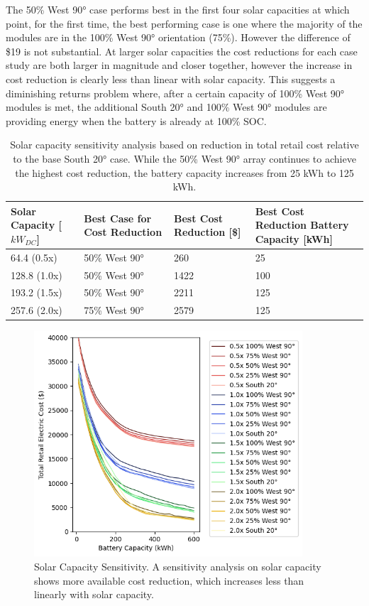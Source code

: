 \documentclass[journal,article,submit,pdftex,moreauthors]{Definitions/mdpi}
\begin{document}
The 50\% West 90° case performs best in the first four solar capacities
at which point, for the first time, the best performing case is one
where the majority of the modules are in the 100\% West 90° orientation
(75\%). However the difference of \$19 is not substantial. At larger
solar capacities the cost reductions for each case study are both larger
in magnitude and closer together, however the increase in cost reduction
is clearly less than linear with solar capacity. This suggests a
diminishing returns problem where, after a certain capacity of 100\%
West 90° modules is met, the additional South 20° and 100\% West 90°
modules are providing energy when the battery is already at 100\% SOC.


\begin{table}[!h]
  \centering
  \caption{Solar capacity sensitivity analysis based on reduction in total
  retail cost relative to the base South 20° case. While the 50\% West 90°
  array continues to achieve the highest cost reduction, the battery
  capacity increases from 25 kWh to 125 kWh.}
  \label{tab:solar-sensitivity}
  \begin{tabularx}{\textwidth}{XXXX}
    \toprule
    Solar Capacity {[}\(kW_{DC}\){]} & Best Case for Cost Reduction         & Best
    Cost Reduction {[}\${]}          & Best Cost Reduction Battery Capacity
    {[}kWh{]}\\
    \midrule
    64.4 (0.5x)                      & 50\% West 90°                        & 260  & 25\\
    128.8 (1.0x)                     & 50\% West 90°                        & 1422 & 100\\
    193.2 (1.5x)                     & 50\% West 90°                        & 2211 & 125\\
    257.6 (2.0x)                     & 75\% West 90°                        & 2579 & 125\\
    \bottomrule
  \end{tabularx}
\end{table}


\begin{figure}
  \centering
  \includegraphics[width=10cm]{./images/total cost reduction solar sensitivity.png}
  \caption{Solar Capacity Sensitivity. A sensitivity
  analysis on solar capacity shows more available cost reduction, which
  increases less than linearly with solar capacity.}
  \label{fig:solar-sensitivity}
\end{figure}
\end{document}
